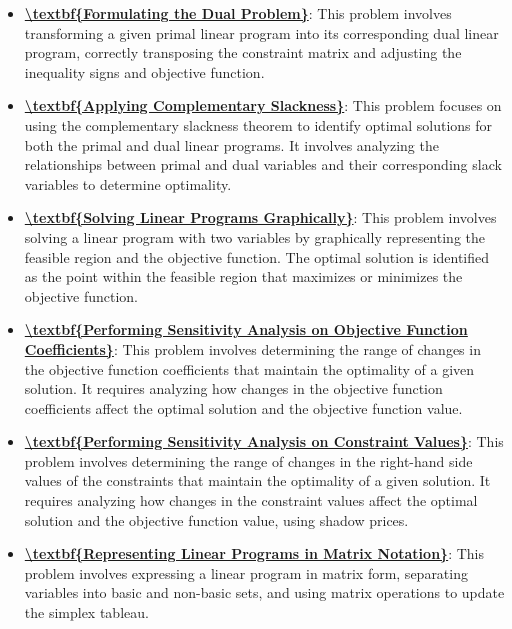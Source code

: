 \documentclass{article}%
\begin{document}
\begin{itemize}[leftmargin=*]%
\item \href{https://www.math.purdue.edu/~yipn/421//2024-12-03-Duality.pdf#page=5}{\textbf{\textbackslash{}textbf\{Formulating the Dual Problem\}}}: This problem involves transforming a given primal linear program into its corresponding dual linear program, correctly transposing the constraint matrix and adjusting the inequality signs and objective function.%
\item \href{https://www.math.purdue.edu/~yipn/421//2024-12-03-Duality.pdf#page=2}{\textbf{\textbackslash{}textbf\{Applying Complementary Slackness\}}}: This problem focuses on using the complementary slackness theorem to identify optimal solutions for both the primal and dual linear programs.  It involves analyzing the relationships between primal and dual variables and their corresponding slack variables to determine optimality.%
\item \href{https://www.math.purdue.edu/~yipn/421//2024-12-03-Duality.pdf#page=3}{\textbf{\textbackslash{}textbf\{Solving Linear Programs Graphically\}}}: This problem involves solving a linear program with two variables by graphically representing the feasible region and the objective function. The optimal solution is identified as the point within the feasible region that maximizes or minimizes the objective function.%
\item \href{https://www.math.purdue.edu/~yipn/421//2024-12-03-Duality.pdf#page=14}{\textbf{\textbackslash{}textbf\{Performing Sensitivity Analysis on Objective Function Coefficients\}}}: This problem involves determining the range of changes in the objective function coefficients that maintain the optimality of a given solution.  It requires analyzing how changes in the objective function coefficients affect the optimal solution and the objective function value.%
\item \href{https://www.math.purdue.edu/~yipn/421//2024-12-03-Duality.pdf#page=11}{\textbf{\textbackslash{}textbf\{Performing Sensitivity Analysis on Constraint Values\}}}: This problem involves determining the range of changes in the right-hand side values of the constraints that maintain the optimality of a given solution. It requires analyzing how changes in the constraint values affect the optimal solution and the objective function value, using shadow prices.%
\item \href{https://www.math.purdue.edu/~yipn/421//2024-12-03-Duality.pdf#page=22}{\textbf{\textbackslash{}textbf\{Representing Linear Programs in Matrix Notation\}}}: This problem involves expressing a linear program in matrix form, separating variables into basic and non-basic sets, and using matrix operations to update the simplex tableau.%
\end{itemize}
\end{document}
